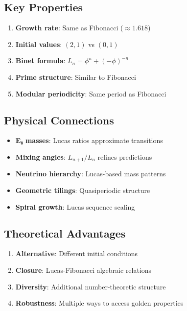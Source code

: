 \subsection{Key Properties}

\begin{enumerate}
    \item \textbf{Growth rate}: Same as Fibonacci ($\approx 1.618$)
    \item \textbf{Initial values}: $(2,1)$ vs $(0,1)$
    \item \textbf{Binet formula}: $L_n = \phi^n + (-\phi)^{-n}$
    \item \textbf{Prime structure}: Similar to Fibonacci
    \item \textbf{Modular periodicity}: Same period as Fibonacci
\end{enumerate}

\subsection{Physical Connections}

\begin{itemize}
    \item \textbf{E₈ masses}: Lucas ratios approximate transitions
    \item \textbf{Mixing angles}: $L_{n+1}/L_n$ refines predictions
    \item \textbf{Neutrino hierarchy}: Lucas-based mass patterns
    \item \textbf{Geometric tilings}: Quasiperiodic structure
    \item \textbf{Spiral growth}: Lucas sequence scaling
\end{itemize}

\subsection{Theoretical Advantages}

\begin{enumerate}
    \item \textbf{Alternative}: Different initial conditions
    \item \textbf{Closure}: Lucas-Fibonacci algebraic relations
    \item \textbf{Diversity}: Additional number-theoretic structure
    \item \textbf{Robustness}: Multiple ways to access golden properties
\end{enumerate}


